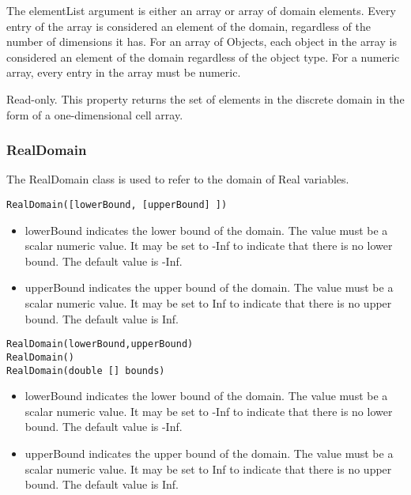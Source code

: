 \ifjava
The elementList argument is either an array or array of domain elements.  Every entry of the array is considered an element of the domain, regardless of the number of dimensions it has.  For an array of Objects, each object in the array is considered an element of the domain regardless of the object type.  For a numeric array, every entry in the array must be numeric.
\fi



Read-only.  This property returns the set of elements in the discrete domain in the form of a one-dimensional \ifmatlab cell \fi array.




\subsubsection{RealDomain}
\label{sec:RealDomain}

The RealDomain class is used to refer to the domain of Real variables.


\ifmatlab
\begin{lstlisting}
RealDomain([lowerBound, [upperBound] ])
\end{lstlisting}

\begin{itemize}
\item lowerBound indicates the lower bound of the domain.  The value must be a scalar numeric value.  It may be set to -Inf to indicate that there is no lower bound.  The default value is -Inf.
\item upperBound indicates the upper bound of the domain.  The value must be a scalar numeric value.  It may be set to Inf to indicate that there is no upper bound.  The default value is Inf.
\end{itemize}

\fi

\ifjava
\begin{lstlisting}
RealDomain(lowerBound,upperBound)
RealDomain()
RealDomain(double [] bounds)
\end{lstlisting}

\begin{itemize}
\item lowerBound indicates the lower bound of the domain.  The value must be a scalar numeric value.  It may be set to -Inf to indicate that there is no lower bound.  The default value is -Inf.
\item upperBound indicates the upper bound of the domain.  The value must be a scalar numeric value.  It may be set to Inf to indicate that there is no upper bound.  The default value is Inf.
\end{itemize}

